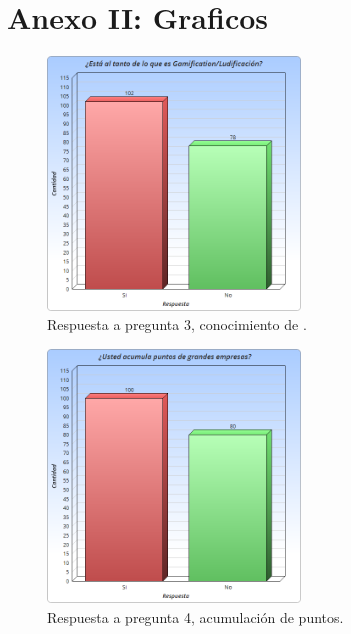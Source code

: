 \section{Anexo II: Graficos }

\begin{figure}[!htb]
    \centering
    \includegraphics[width=0.6\textwidth]{images/Graficos/graf_5_1.png}
    \caption[chart5.1]{Respuesta a pregunta $3$, conocimiento de {\GAM}.}
    \label{fig:chart5.1}
\end{figure}

\begin{figure}[!htb]
    \centering
    \includegraphics[width=0.6\textwidth]{images/Graficos/graf_5_2.png}
    \caption[chart5.2]{Respuesta a pregunta 4, acumulación de puntos.}
    \label{fig:chart5.2}
\end{figure}

